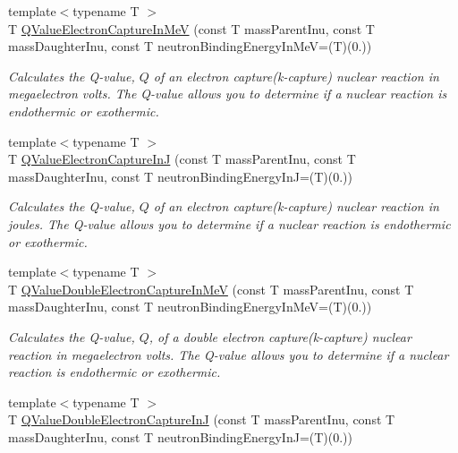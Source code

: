 \begin{DoxyCompactItemize}
{\footnotesize template$<$typename T $>$ }\\T \mbox{\hyperlink{group___e_g_x_phys-_q_value-_electron_capture_ga9cd8502b6101614c17114e9710cdcf6c}{Q\+Value\+Electron\+Capture\+In\+MeV}} (const T mass\+Parent\+Inu, const T mass\+Daughter\+Inu, const T neutron\+Binding\+Energy\+In\+MeV=(T)(0.))
\begin{DoxyCompactList}\small\item\em Calculates the Q-\/value, $Q$ of an electron capture(k-\/capture) nuclear reaction in megaelectron volts. The Q-\/value allows you to determine if a nuclear reaction is endothermic or exothermic. \end{DoxyCompactList}\item 
{\footnotesize template$<$typename T $>$ }\\T \mbox{\hyperlink{group___e_g_x_phys-_q_value-_electron_capture_gaf2569f9c706130b730dcf55695780263}{Q\+Value\+Electron\+Capture\+InJ}} (const T mass\+Parent\+Inu, const T mass\+Daughter\+Inu, const T neutron\+Binding\+Energy\+InJ=(T)(0.))
\begin{DoxyCompactList}\small\item\em Calculates the Q-\/value, $Q$ of an electron capture(k-\/capture) nuclear reaction in joules. The Q-\/value allows you to determine if a nuclear reaction is endothermic or exothermic. \end{DoxyCompactList}\item 
{\footnotesize template$<$typename T $>$ }\\T \mbox{\hyperlink{group___e_g_x_phys-_q_value-_electron_capture_gab16ac92ae27b2c0c96c7abc35f949cb8}{Q\+Value\+Double\+Electron\+Capture\+In\+MeV}} (const T mass\+Parent\+Inu, const T mass\+Daughter\+Inu, const T neutron\+Binding\+Energy\+In\+MeV=(T)(0.))
\begin{DoxyCompactList}\small\item\em Calculates the Q-\/value, $Q$, of a double electron capture(k-\/capture) nuclear reaction in megaelectron volts. The Q-\/value allows you to determine if a nuclear reaction is endothermic or exothermic. \end{DoxyCompactList}\item 
{\footnotesize template$<$typename T $>$ }\\T \mbox{\hyperlink{group___e_g_x_phys-_q_value-_electron_capture_gacb431a07ac565f8e48a08c25544e5d22}{Q\+Value\+Double\+Electron\+Capture\+InJ}} (const T mass\+Parent\+Inu, const T mass\+Daughter\+Inu, const T neutron\+Binding\+Energy\+InJ=(T)(0.))

\end{DoxyCompactItemize}
